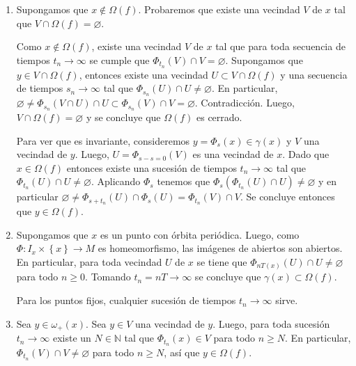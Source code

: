 \documentclass[10pt]{article}
\begin{document}
\begin{enumerate}[label=(\roman*)]
	\item
	Supongamos que \(x\not\in \Omega(f)\). Probaremos que existe una vecindad
	\(V\) de \(x\) tal que \(V\cap \Omega(f) = \varnothing\).

	Como \(x\not\in\Omega(f)\), existe una vecindad \(V\) de \(x\) tal que para toda secuencia
	de tiempos \(t_n\to \infty\) se cumple que \(\Phi_{t_n} (V) \cap V =
	\varnothing\). Supongamos que \(y \in V\cap\Omega(f)\), entonces existe una
	vecindad \(U \subset V\cap\Omega(f)\) y una secuencia de tiempos \(s_n\to
	\infty\) tal que \(\Phi_{s_n}(U)\cap U \ne \varnothing\). En particular,
	\(\varnothing \ne \Phi_{s_n}(V\cap U) \cap U \subset
	\Phi_{s_n}(V)\cap V = \varnothing\). Contradicción. Luego, \(V\cap\Omega(f)
	= \varnothing\) y se concluye que \(\Omega(f)\) es cerrado.

	Para ver que es invariante, consideremos \(y = \Phi_{s}(x) \in \gamma(x)\) y \(V\) una
	vecindad de \(y\). Luego, \(U = \Phi_{s-s=0}(V)\) es una vecindad de \(x\). Dado
	que \(x\in \Omega(f)\) entonces existe una sucesión de tiempos \(t_n\to \infty\)
	tal que \(\Phi_{t_n}(U) \cap U \ne \varnothing\). Aplicando \(\Phi_{s}\)
	tenemos que \(\Phi_s(\Phi_{t_n}(U) \cap U) \ne \varnothing\) y en particular
	\(\varnothing \ne \Phi_{s+t_n}(U) \cap \Phi_s(U) = \Phi_{t_n}(V) \cap V \).
	Se concluye entonces que \(y\in \Omega(f)\).


	\item Supongamos que \(x\) es un punto con órbita periódica. Luego, como
	\(\Phi\colon I_x\times \left\{ x \right\}\to M\) es homeomorfismo, las
	imágenes de abiertos son abiertos. En particular, para toda vecindad \(U\)
	de \(x\) se tiene que \(\Phi_{nT(x)}(U) \cap U \ne \varnothing\) para todo
	\(n\ge 0\). Tomando \(t_n = nT\to \infty\) se concluye que \(\gamma(x)
	\subset \Omega(f)\).

	Para los puntos fijos, cualquier sucesión de tiempos \(t_n \to \infty\)
	sirve.

	\item Sea \(y\in \omega_{+}(x)\). Sea \(y\in V\) una vecindad de \(y\).
	Luego, para toda sucesión \(t_n \to \infty\) existe un \(N\in \mathbb{N}\) tal
	que \(\Phi_{t_n}(x)\in V\) para todo \(n\ge N\). En particular,
	\(\Phi_{t_n}(V) \cap V \ne \varnothing\) para todo \(n\ge N\), así que
	\(y\in \Omega(f)\).
\end{enumerate}
\end{document}

